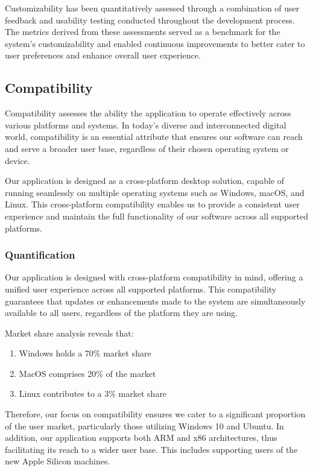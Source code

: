 \documentclass[11pt,a4paper]{article}
\begin{document}
Customizability has been quantitatively assessed through a combination of user
feedback and usability testing conducted throughout the development process. The
metrics derived from these assessments served as a benchmark for the system's
customizability and enabled continuous improvements to better cater to user
preferences and enhance overall user experience.

\subsection*{Compatibility}

Compatibility assesses the ability the application to operate effectively across
various platforms and systems. In today's diverse and interconnected digital
world, compatibility is an essential attribute that ensures our software can
reach and serve a broader user base, regardless of their chosen operating system
or device.

Our application is designed as a cross-platform desktop solution, capable of
running seamlessly on multiple operating systems such as Windows, macOS, and
Linux. This cross-platform compatibility enables us to provide a consistent user
experience and maintain the full functionality of our software across all
supported platforms.

\subsubsection*{Quantification}

Our application is designed with cross-platform compatibility in mind, offering
a unified user experience across all supported platforms. This compatibility
guarantees that updates or enhancements made to the system are simultaneously
available to all users, regardless of the platform they are using.

Market share analysis reveals that:

\begin{enumerate}
  \item Windows holds a 70\% market share
  \item MacOS comprises 20\% of the market
  \item Linux contributes to a 3\% market share
\end{enumerate}

Therefore, our focus on compatibility ensures we cater to a significant
proportion of the user market, particularly those utilizing Windows 10 and
Ubuntu. In addition, our application supports both ARM and x86 architectures,
thus facilitating its reach to a wider user base. This includes supporting users
of the new Apple Silicon machines.
\end{document}
